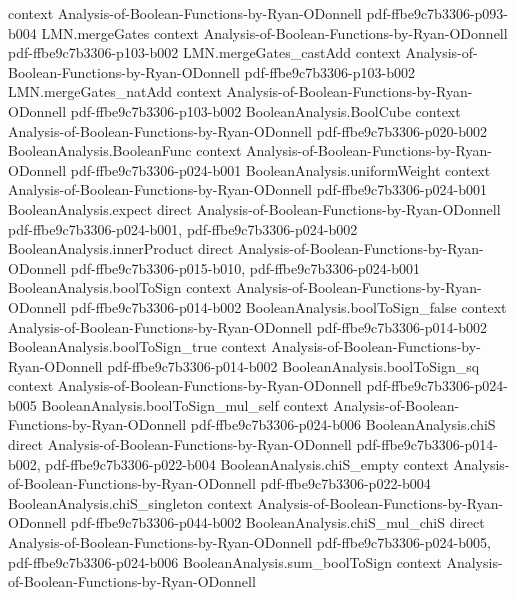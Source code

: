 \begin{lemma}
  {context}
  {Analysis-of-Boolean-Functions-by-Ryan-ODonnell}
  {pdf-ffbe9c7b3306-p093-b004}
\proofstep
  {LMN.mergeGates}
  {context}
  {Analysis-of-Boolean-Functions-by-Ryan-ODonnell}
  {pdf-ffbe9c7b3306-p103-b002}
\proofstep
  {LMN.mergeGates_castAdd}
  {context}
  {Analysis-of-Boolean-Functions-by-Ryan-ODonnell}
  {pdf-ffbe9c7b3306-p103-b002}
\proofstep
  {LMN.mergeGates_natAdd}
  {context}
  {Analysis-of-Boolean-Functions-by-Ryan-ODonnell}
  {pdf-ffbe9c7b3306-p103-b002}
\proofstep
  {BooleanAnalysis.BoolCube}
  {context}
  {Analysis-of-Boolean-Functions-by-Ryan-ODonnell}
  {pdf-ffbe9c7b3306-p020-b002}
\proofstep
  {BooleanAnalysis.BooleanFunc}
  {context}
  {Analysis-of-Boolean-Functions-by-Ryan-ODonnell}
  {pdf-ffbe9c7b3306-p024-b001}
\proofstep
  {BooleanAnalysis.uniformWeight}
  {context}
  {Analysis-of-Boolean-Functions-by-Ryan-ODonnell}
  {pdf-ffbe9c7b3306-p024-b001}
\proofstep
  {BooleanAnalysis.expect}
  {direct}
  {Analysis-of-Boolean-Functions-by-Ryan-ODonnell}
  {pdf-ffbe9c7b3306-p024-b001,
    pdf-ffbe9c7b3306-p024-b002}
\proofstep
  {BooleanAnalysis.innerProduct}
  {direct}
  {Analysis-of-Boolean-Functions-by-Ryan-ODonnell}
  {pdf-ffbe9c7b3306-p015-b010,
    pdf-ffbe9c7b3306-p024-b001}
\proofstep
  {BooleanAnalysis.boolToSign}
  {context}
  {Analysis-of-Boolean-Functions-by-Ryan-ODonnell}
  {pdf-ffbe9c7b3306-p014-b002}
\proofstep
  {BooleanAnalysis.boolToSign_false}
  {context}
  {Analysis-of-Boolean-Functions-by-Ryan-ODonnell}
  {pdf-ffbe9c7b3306-p014-b002}
\proofstep
  {BooleanAnalysis.boolToSign_true}
  {context}
  {Analysis-of-Boolean-Functions-by-Ryan-ODonnell}
  {pdf-ffbe9c7b3306-p014-b002}
\proofstep
  {BooleanAnalysis.boolToSign_sq}
  {context}
  {Analysis-of-Boolean-Functions-by-Ryan-ODonnell}
  {pdf-ffbe9c7b3306-p024-b005}
\proofstep
  {BooleanAnalysis.boolToSign_mul_self}
  {context}
  {Analysis-of-Boolean-Functions-by-Ryan-ODonnell}
  {pdf-ffbe9c7b3306-p024-b006}
\proofstep
  {BooleanAnalysis.chiS}
  {direct}
  {Analysis-of-Boolean-Functions-by-Ryan-ODonnell}
  {pdf-ffbe9c7b3306-p014-b002,
    pdf-ffbe9c7b3306-p022-b004}
\proofstep
  {BooleanAnalysis.chiS_empty}
  {context}
  {Analysis-of-Boolean-Functions-by-Ryan-ODonnell}
  {pdf-ffbe9c7b3306-p022-b004}
\proofstep
  {BooleanAnalysis.chiS_singleton}
  {context}
  {Analysis-of-Boolean-Functions-by-Ryan-ODonnell}
  {pdf-ffbe9c7b3306-p044-b002}
\proofstep
  {BooleanAnalysis.chiS_mul_chiS}
  {direct}
  {Analysis-of-Boolean-Functions-by-Ryan-ODonnell}
  {pdf-ffbe9c7b3306-p024-b005,
    pdf-ffbe9c7b3306-p024-b006}
\proofstep
  {BooleanAnalysis.sum_boolToSign}
  {context}
  {Analysis-of-Boolean-Functions-by-Ryan-ODonnell}

\end{lemma}
